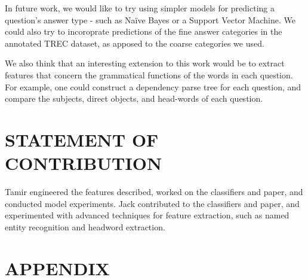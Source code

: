 \documentclass[letterpaper, 10 pt, conference]{ieeeconf}  %
\begin{document}
In future work, we would like to try using simpler models for predicting a question's answer type - such as Naïve Bayes or a Support Vector Machine. We could also try to incoroprate predictions of the fine answer categories in the annotated TREC dataset, as apposed to the coarse categories we used. 

We also think that an interesting extension to this work would be to extract features that concern the grammatical functions of the words in each question. For example, one could construct a dependency parse tree for each question, and compare the subjects, direct objects, and head-words of each question.

\addtolength{\textheight}{-12cm}   %









\section{STATEMENT OF CONTRIBUTION}

Tamir engineered the features described, worked on the classifiers and paper, and conducted model experiments. Jack contributed to the classifiers and paper, and experimented with advanced techniques for feature extraction, such as named entity recognition and headword extraction. 


\section*{APPENDIX}
\end{document}
